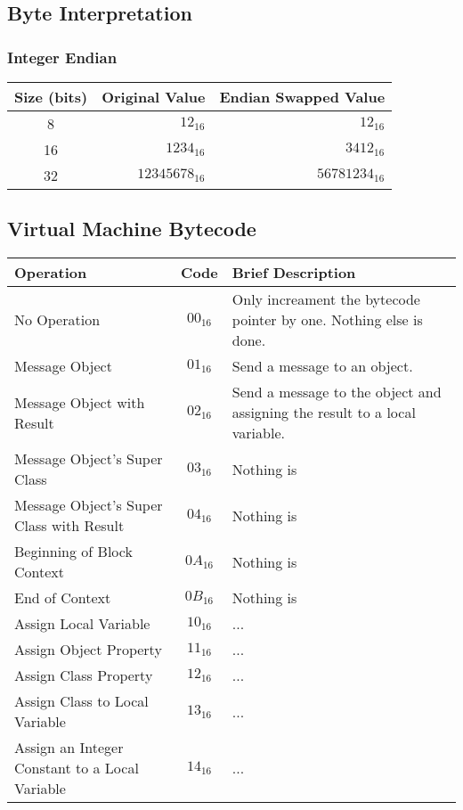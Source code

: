 \subsection {Byte Interpretation}

\subsubsection {Integer Endian}

\begin{center}
  \begin{tabular}{ c r r }
    Size (bits) & Original Value & Endian Swapped Value\\ \hline
    8 & $12_{16}$ & $12_{16}$ \\
    16 & $1234_{16}$ & $3412_{16}$ \\
    32 & $12345678_{16}$ & $56781234_{16}$ \\
  \end{tabular}
\end{center}

\subsection {Virtual Machine Bytecode}

\begin{center}
  \begin{tabular}{ | p{6cm} | c | p{8cm} | }
    \hline
    Operation & Code & Brief Description \\ \hline
    No Operation & $00_{16}$ & Only increament the bytecode pointer by one.
                              Nothing else is done. \\
    Message Object & $01_{16}$ & Send a message to an object. \\
    Message Object with Result & $02_{16}$ & Send a message to the object
                                            and assigning the result to a
                                            local variable. \\
    Message Object's Super Class & $03_{16}$ & Nothing is \\
    Message Object's Super Class with Result & $04_{16}$ & Nothing is \\
    Beginning of Block Context & $0A_{16}$ & Nothing is \\
    End of Context & $0B_{16}$ & Nothing is \\
    Assign Local Variable & $10_{16}$ & ...\\
    Assign Object Property & $11_{16}$ & ...\\
    Assign Class Property & $12_{16}$ & ...\\
    Assign Class to Local Variable & $13_{16}$ & ...\\
    Assign an Integer Constant to a Local Variable & $14_{16}$ & ...\\
    \hline
  \end{tabular}
\end{center}
